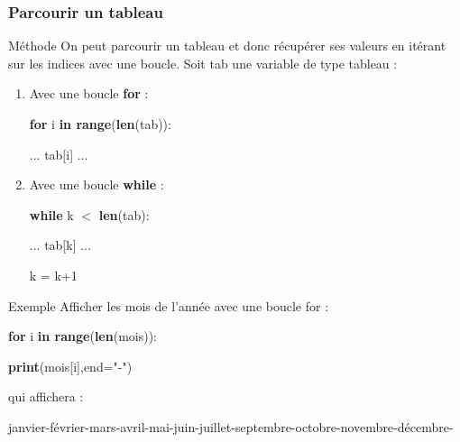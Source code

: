 \documentclass[9pt]{beamer}
\newcounter{num}
\begin{document}
\begin{frame}
\frametitle{Parcourir un tableau}

\begin{block}{Méthode}
On peut parcourir un tableau et donc récupérer ses valeurs en itérant sur les indices avec une boucle. Soit tab une variable de type tableau :
\begin{enumerate}
\item Avec une boucle \textbf{for} :

\textbf{for} i \textbf{in range}(\textbf{len}(tab)):

\hspace{0.5cm} ... tab[i] ...

\item Avec une boucle \textbf{while} :

\textbf{while} k $<$ \textbf{len}(tab):

\hspace{0.5cm} ... tab[k] ...

\hspace{0.5cm} k = k+1
\end{enumerate}
\end{block}

\begin{exampleblock}{Exemple}
Afficher les mois de l'année avec une boucle for : \smallskip

\textbf{for} i \textbf{in range}(\textbf{len}(mois)):

\hspace{0.5cm} \textbf{print}(mois[i],end="-")\smallskip
    
qui affichera : 

janvier-février-mars-avril-mai-juin-juillet-septembre-octobre-novembre-décembre-
\end{exampleblock}

\end{frame}
\end{document}
